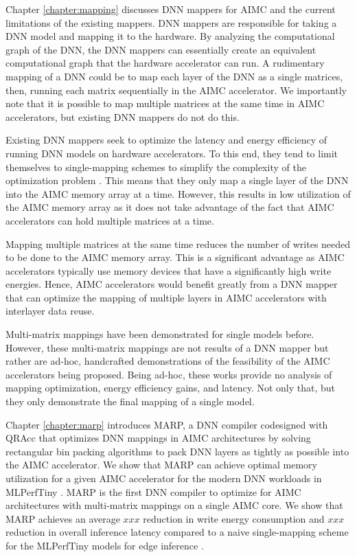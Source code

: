 Chapter \ref{chapter:mapping} discusses DNN mappers for AIMC and the current limitations of the existing mappers. DNN mappers are responsible for taking a DNN model and mapping it to the hardware. By analyzing the computational graph of the DNN, the DNN mappers can essentially create an equivalent computational graph that the hardware accelerator can run. A rudimentary mapping of a DNN could be to map each layer of the DNN as a single matrices, then, running each matrix sequentially in the AIMC accelerator. We importantly note that it is possible to map multiple matrices at the same time in AIMC accelerators, but existing DNN mappers do not do this.

Existing DNN mappers seek to optimize the latency and energy efficiency of running DNN models on hardware accelerators. To this end, they tend to limit themselves to single-mapping schemes to simplify the complexity of the optimization problem \cite{mei2021zigzag,symons2024stream,andrulis2024cimloop,lammie2024lionheart,chen2018neurosim}. This means that they only map a single layer of the DNN into the AIMC memory array at a time. However, this results in low utilization of the AIMC memory array as it does not take advantage of the fact that AIMC accelerators can hold multiple matrices at a time. 

Mapping multiple matrices at the same time reduces the number of writes needed to be done to the AIMC memory array. This is a significant advantage as AIMC accelerators typically use memory devices that have a significantly high write energies. Hence, AIMC accelerators would benefit greatly from a DNN mapper that can optimize the mapping of multiple layers in AIMC accelerators with interlayer data reuse.

Multi-matrix mappings \cite{wanneurram,garofalo2022heterogeneous,zhou2022ml} have been demonstrated for single models before. However, these multi-matrix mappings are not results of a DNN mapper but rather are ad-hoc, handcrafted demonstrations of the feasibility of the AIMC accelerators being proposed. Being ad-hoc, these works provide no analysis of mapping optimization, energy efficiency gains, and latency. Not only that, but they only demonstrate the final mapping of a single model.

Chapter \ref{chapter:marp} introduces MARP, a DNN compiler codesigned with QRAcc that optimizes DNN mappings in AIMC architectures by solving rectangular bin packing algorithms to pack DNN layers as tightly as possible into the AIMC accelerator. We show that MARP can achieve optimal memory utilization for a given AIMC accelerator for the modern DNN workloads in MLPerfTiny \cite{}. MARP is the first DNN compiler to optimize for AIMC architectures with multi-matrix mappings on a single AIMC core. We show that MARP achieves an average $xxx$ reduction in write energy consumption and $xxx$ reduction in overall inference latency compared to a naive single-mapping scheme for the MLPerfTiny models for edge inference \cite{banbury2021mlperf}.

